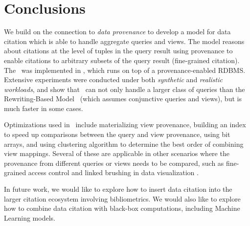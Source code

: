 \section{Conclusions}\label{sec: conclusion}
We build on the connection to {\em data provenance} to develop a model for  data citation which is able to handle aggregate queries and views. The model reasons about citations at the level of tuples in the query result using provenance to enable citations to arbitrary subsets of the query result (fine-grained citation).  The \pbafull\ was implemented in \provalg, which runs on top of a provenance-enabled RDBMS.  Extensive experiments were conducted under both {\em synthetic} and {\em realistic workloads}, and show that \provalg\ can not only handle a {larger class of queries} than the Rewriting-Based Model~\cite{wu2018data} (which assumes conjunctive queries and views), but is much faster in some cases.   

Optimizations used in \provalg\ include materializing view provenance, 
building an index %
to speed up comparisons between the query and view provenance, using bit arrays, and using clustering algorithm to determine the best order of combining view mappings.
Several of these are applicable in other scenarios where the provenance from different queries or views needs to be compared, such as fine-grained access control \cite{goyal2006attribute} and linked brushing in data visualization \cite{psallidas2018smoke}.

In future work, we would like to explore how to insert data citation into the larger citation ecosystem involving bibliometrics. We would also like to explore how to combine data citation with black-box computations, including Machine Learning models. 

